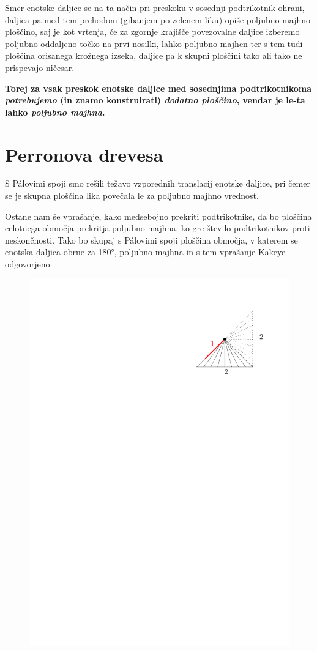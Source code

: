 \documentclass[a4paper, 12pt]{article}
\begin{document}
Smer enotske daljice se na ta način pri preskoku v sosednji podtrikotnik ohrani, daljica pa med tem prehodom (gibanjem po zelenem liku) opiše poljubno majhno ploščino, saj je kot vrtenja, če za zgornje krajišče povezovalne daljice izberemo poljubno oddaljeno točko na prvi nosilki, lahko poljubno majhen ter s tem tudi ploščina orisanega krožnega izseka, daljice pa k skupni ploščini tako ali tako ne prispevajo ničesar.

\textbf{Torej za vsak preskok enotske daljice med sosednjima podtrikotnikoma \emph{potrebujemo} (in znamo konstruirati) \emph{dodatno ploščino}, vendar je le-ta lahko \emph{poljubno majhna}.}


\section*{Perronova drevesa}

S Pálovimi spoji smo rešili težavo vzporednih translacij enotske daljice, pri čemer se je skupna ploščina lika povečala le za poljubno majhno vrednost.

Ostane nam še vprašanje, kako medsebojno prekriti podtrikotnike, da bo ploščina celotnega območja prekritja poljubno majhna, ko gre število podtrikotnikov proti neskončnosti. Tako bo skupaj s Pálovimi spoji ploščina območja, v katerem se enotska daljica obrne za 180°, poljubno majhna in s tem vprašanje Kakeye odgovorjeno.

\begin{figure}
    \includegraphics[width=0.9\linewidth]{ipe_slike/polovica_trikotnika.pdf}
\end{figure}
\end{document}
